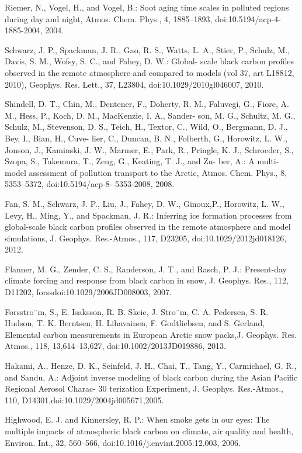 \documentclass[12pt]{article}
\begin{document}
Riemer, N., Vogel, H., and Vogel, B.: Soot aging time scales in polluted regions during day and night, Atmos. Chem. Phys., 4, 1885–1893, doi:10.5194/acp-4-1885-2004, 2004. 

Schwarz, J. P., Spackman, J. R., Gao, R. S., Watts, L. A., Stier, P., Schulz, M., Davis, S. M., Wofsy, S. C., and Fahey, D. W.: Global- scale black carbon profiles observed in the remote atmosphere and compared to models (vol 37, art L18812, 2010), Geophys. Res. Lett., 37, L23804, doi:10.1029/2010gl046007, 2010. 

Shindell, D. T., Chin, M., Dentener, F., Doherty, R. M., Faluvegi, G., Fiore, A. M., Hess, P., Koch, D. M., MacKenzie, I. A., Sander- son, M. G., Schultz, M. G., Schulz, M., Stevenson, D. S., Teich, H., Textor, C., Wild, O., Bergmann, D. J., Bey, I., Bian, H., Cuve- lier, C., Duncan, B. N., Folberth, G., Horowitz, L. W., Jonson, J., Kaminski, J. W., Marmer, E., Park, R., Pringle, K. J., Schroeder, S., Szopa, S., Takemura, T., Zeng, G., Keating, T. J., and Zu- ber, A.: A multi-model assessment of pollution transport to the Arctic, Atmos. Chem. Phys., 8, 5353–5372, doi:10.5194/acp-8- 5353-2008, 2008. 

Fan, S. M., Schwarz, J. P., Liu, J., Fahey, D. W., Ginoux,P., Horowitz, L. W., Levy, H., Ming, Y., and Spackman, J. R.: Inferring ice formation processes from global-scale black carbon profiles observed in the remote atmosphere and model simulations, J. Geophys. Res.-Atmos., 117, D23205, doi:10.1029/2012jd018126, 2012.

Flanner, M. G., Zender, C. S., Randerson, J. T., and Rasch, P. J.: Present-day climate forcing and response from black carbon in snow, J. Geophys. Res., 112, D11202, forssdoi:10.1029/2006JD008003, 2007.

Forsstro¨m, S., E. Isaksson, R. B. Skeie, J. Stro¨m, C. A. Pedersen, S. R. Hudson, T. K. Berntsen, H. Lihavainen, F. Godtliebsen, and S. Gerland, Elemental carbon measurements in European Arctic snow packs,J. Geophys. Res. Atmos., 118, 13,614–13,627, doi:10.1002/2013JD019886, 2013.

Hakami, A., Henze, D. K., Seinfeld, J. H., Chai, T., Tang, Y., Carmichael, G. R., and Sandu, A.: Adjoint inverse modeling of black carbon during the Asian Pacific Regional Aerosol Charac- 30 terization Experiment, J. Geophys. Res.-Atmos., 110, D14301,doi:10.1029/2004jd005671,2005.

Highwood, E. J. and Kinnersley, R. P.: When smoke gets in our eyes: The multiple impacts of atmospheric black carbon on climate, air quality and health, Environ. Int., 32, 560–566, doi:10.1016/j.envint.2005.12.003, 2006.
\end{document}
